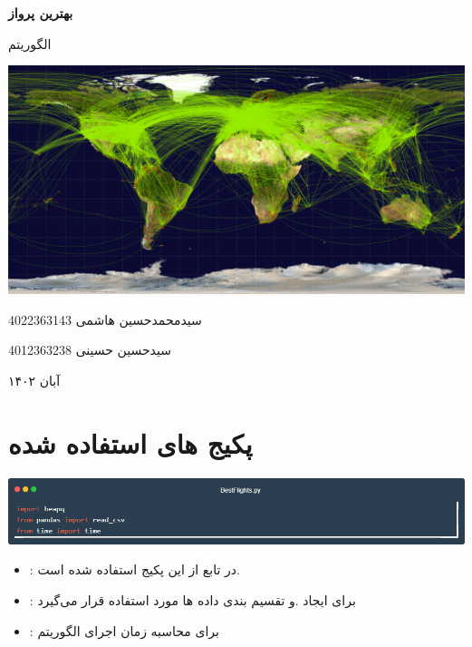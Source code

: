 \documentclass[12pt, dvipsnames, svgnames, x11names,]{article}
\begin{document}
	\begin{titlepage}
		\centering
		\vspace{1cm}
		{\Huge {\textbf{بهترین پرواز}}\par}
		\vspace{15mm}
		{\Large  الگوریتم  } \par
		\vspace{16mm}
		\includegraphics[width=14cm]{images/openflights-routedb} \par
		\vfill \par	\vfill
		\vspace{16mm}
		{\normalsize	سیدمحمدحسین هاشمی  4022363143 \par}
		
		{\normalsize	سیدحسین حسینی  4012363238 \par}
		\vspace{1cm}
		{\large آبان ۱۴۰۲\par}
	\end{titlepage}
	\tableofcontents
	\newpage
	
	
	\section{پکیج های استفاده شده}
	
		{\includegraphics[width=14cm]{images/libraries}}
			
		\begin{itemize}
				
			\item 
				{\Large {}:}
				{\small در تابع  از این پکیج استفاده شده است.}
				
			\item 
				{\Large {}:}
				{\small برای ایجاد  .و تقسیم بندی داده ها مورد استفاده قرار می‌گیرد}
				
			\item 
				{\Large {}:}
				{\small برای محاسبه زمان اجرای الگوریتم}

		\end{itemize}
			
\end{document}
